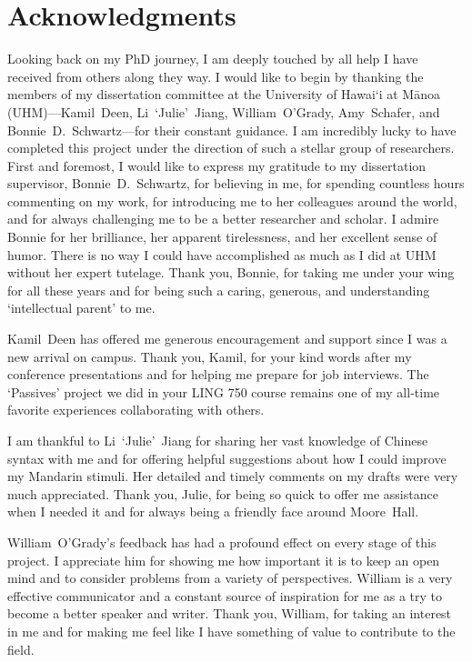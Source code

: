 
\chapter*{Acknowledgments}
\setlength{\parindent}{2.6em}

Looking back on my PhD journey, I am deeply touched by all help I have received from others along they way. I would like to begin by thanking the members of my dissertation committee at the University of Hawai`i at Mānoa (UHM)---Kamil~Deen, Li~`Julie'~Jiang, William~O'Grady, Amy~Schafer, and Bonnie~D.~Schwartz---for their constant guidance. I am incredibly lucky to have completed this project under the direction of such a stellar group of researchers. First and foremost, I would like to express my gratitude to my dissertation supervisor, Bonnie~D.~Schwartz, for believing in me, for spending countless hours commenting on my work, for introducing me to her colleagues around the world, and for always challenging me to be a better researcher and scholar. I admire Bonnie for her brilliance, her apparent tirelessness, and her excellent sense of humor. There is no way I could have accomplished as much as I did at UHM without her expert tutelage. Thank you, Bonnie, for taking me under your wing for all these years and for being such a caring, generous, and understanding `intellectual parent' to me.

Kamil~Deen has offered me generous encouragement and support since I was a new arrival on campus. Thank you, Kamil, for your kind words after my conference presentations and for helping me prepare for job interviews. The `Passives' project we did in your LING 750 course remains one of my all-time favorite experiences collaborating with others.

I am thankful to Li~`Julie'~Jiang for sharing her vast knowledge of Chinese syntax with me and for offering helpful suggestions about how I could improve my Mandarin stimuli. Her detailed and timely comments on my drafts were very much appreciated. Thank you, Julie, for being so quick to offer me assistance when I needed it and for always being a friendly face around Moore~Hall.

William~O'Grady's feedback has had a profound effect on every stage of this project. I appreciate him for showing me how important it is to keep an open mind and to consider problems from a variety of perspectives. William is a very effective communicator and a constant source of inspiration for me as a try to become a better speaker and writer. Thank you, William, for taking an interest in me and for making me feel like I have something of value to contribute to the field.

